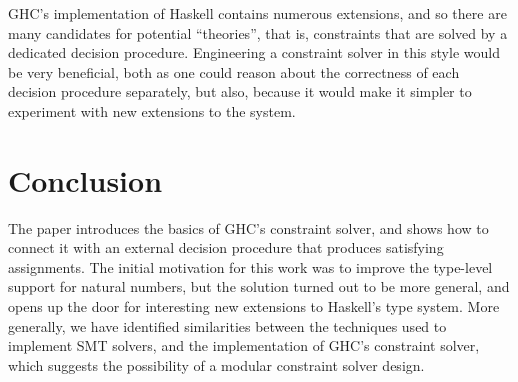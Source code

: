 \documentclass{sigplanconf}
\begin{document}
GHC's implementation of Haskell contains numerous extensions, and so
there are many candidates for potential ``theories'', that is, constraints
that are solved by a dedicated decision procedure.  Engineering a
constraint solver in this style would be very beneficial, both
as one could reason about the correctness of each decision procedure
separately, but also, because it would make it simpler to experiment
with new extensions to the system.

\section {Conclusion}

The paper introduces the basics of GHC's constraint solver, and shows
how to connect it with an external decision procedure that produces
satisfying assignments.  The initial motivation for this work was
to improve the type-level support for natural numbers, but the solution
turned out to be more general, and opens up the door for interesting
new extensions to Haskell's type system.  More generally, we have
identified similarities between the techniques used to implement SMT solvers,
and the implementation of GHC's constraint solver, which suggests
the possibility of a modular constraint solver design.











% 
% 
% 
% 
\end{document}
